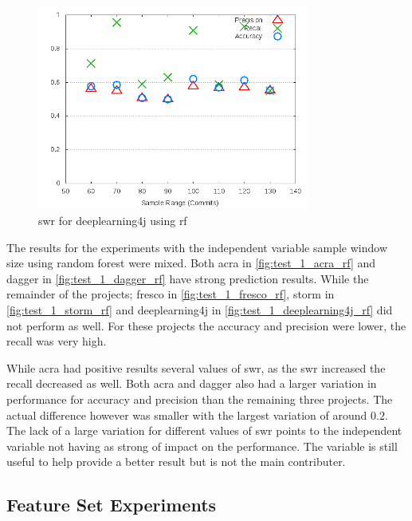 \begin{figure}[!ht]
    \centering
        \includegraphics[width=0.8\textwidth]{images/rf/test_1/deeplearning4j_sample_range}
    \caption{\gls{swr} for deeplearning4j using \gls{rf}}
    \label{fig:test_1_deeplearning4j_rf}
\end{figure}

The results for the experiments with the independent variable sample window size using random forest were mixed. Both acra in \autoref{fig:test_1_acra_rf} and dagger in \autoref{fig:test_1_dagger_rf} have strong prediction results. While the remainder of the projects; fresco in \autoref{fig:test_1_fresco_rf}, storm in \autoref{fig:test_1_storm_rf} and deeplearning4j in \autoref{fig:test_1_deeplearning4j_rf} did not perform as well. For these projects the accuracy and precision were lower, the recall was very high.

While acra had positive results several values of \gls{swr}, as the \gls{swr} increased the recall decreased as well. Both acra and dagger also had a larger variation in performance for accuracy and precision than the remaining three projects. The actual difference however was smaller with the largest variation of around $0.2$. The lack of a large variation for different values of \gls{swr} points to the independent variable not having as strong of impact on the performance. The variable is still useful to help provide a better result but is not the main contributer.

\subsection{Feature Set Experiments}

